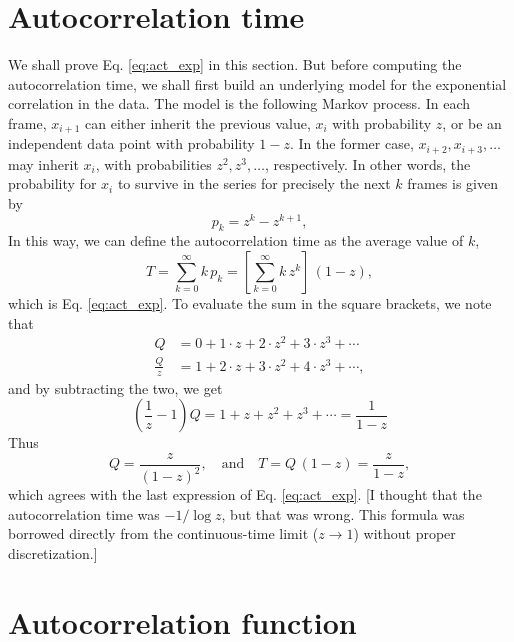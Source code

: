 \documentclass[12pt]{article}
\begin{document}
\section{Autocorrelation time}


We shall prove Eq. \eqref{eq:act_exp} in this section.
%
But before computing the autocorrelation time,
we shall first build an underlying model
for the exponential correlation in the data.
%
The model is the following Markov process.
%
In each frame,
$x_{ i + 1 }$
can either inherit the previous value, $x_i$
with probability $z$,
or be an independent data point
with probability $1 - z$.
%
In the former case, $x_{i + 2}, x_{i + 3}, \dots$
may inherit $x_i$,
with probabilities $z^2, z^3, \dots$,
respectively.
%
In other words,
the probability for $x_i$ to survive in the series for precisely
the next $k$ frames is given by
%
\begin{equation}
  p_k = z^k - z^{ k + 1 },
  \label{eq:pk_exp}
\end{equation}
%
In this way, we can define the autocorrelation time as
the average value of $k$,
%
\begin{equation}
  T
  =
  \sum_{k = 0}^\infty
    k \, p_k
  =
  \left[
  \sum_{k = 0}^\infty
    k \, z^k
  \right]
  \, (1 - z),
\end{equation}
which is Eq. \eqref{eq:act_exp}.
%
To evaluate the sum in the square brackets, we note that
%
\begin{align*}
  Q
  &=
  0 + 1 \cdot z + 2 \cdot z^2 + 3 \cdot z^3 + \cdots
  \\
  \frac{ Q } { z }
  &=
  1 + 2 \cdot z + 3 \cdot z^2 + 4 \cdot z^3 + \cdots,
\end{align*}
%
and by subtracting the two, we get
%
\begin{equation*}
  \left( \frac 1 z - 1 \right) Q
  =
  1 + z + z^2 + z^3 + \cdots
  =
  \frac { 1 } { 1 - z }
\end{equation*}
%
Thus
%
\begin{equation*}
  Q
  =
  \frac{ z } { (1 - z)^2 },
  \quad
  \mathrm{and}
  \quad
  T
  =
  Q \, (1 - z)
  =
  \frac{ z } { 1 - z },
\end{equation*}
%
which agrees with the last expression of Eq. \eqref{eq:act_exp}.
%
[I thought that the autocorrelation time was $-1/\log z$,
but that was wrong.
This formula was borrowed directly
from the continuous-time limit ($z \to 1$)
without proper discretization.]


\section{Autocorrelation function}
\end{document}
